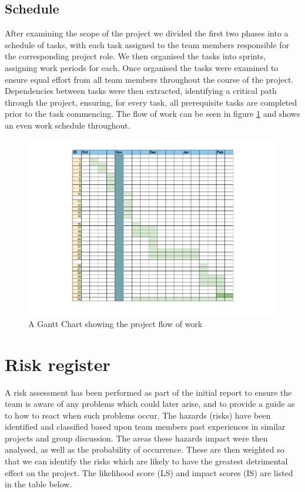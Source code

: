 \documentclass[10pt,a4paper]{article}
\begin{document}
\subsection{Schedule}
After examining the scope of the project we divided the first two phases into a schedule of tasks, with each task assigned to the team members responsible for the corresponding project role. We then organised the tasks into sprints, assigning work periods for each. Once organised the tasks were examined to ensure equal effort from all team members throughout the course of the project. Dependencies between tasks were then extracted, identifying a critical path through the project, ensuring, for every task, all prerequisite tasks are completed prior to the task commencing.  The flow of work can be seen in figure \ref{fig:Gantt} and shows an even work schedule throughout.

\begin{figure}[H]
	\centering
	\includegraphics[width =21cm, trim=4cm 2cm 0cm 1.5cm]{pdf-images/gant}
	\caption{A Gantt Chart showing the project flow of work} 
	\label{fig:Gantt}
\end{figure}
\section{Risk register}

A risk assessment has been performed as part of the initial report to ensure the
team is aware of any problems which could later arise, and to provide a guide as
to how to react when such problems occur. The hazards (risks) have been
identified and classified based upon team members past experiences in similar
projects and group discussion. The areas these hazards impact were then
analysed, as well as the probability of occurrence. These are then weighted so
that we can identify the risks which are likely to have the greatest detrimental
effect on the project. The likelihood score (LS) and impact scores (IS) are
listed in the table below.
\end{document}

